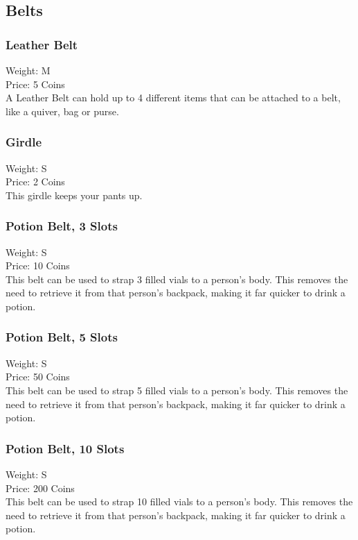 \subsection{Belts}\label{subsec:belts}

\subsubsection{Leather Belt}\label{item:leatherbelt}
Weight: M\\
Price: 5 Coins\\
A Leather Belt can hold up to 4 different items that can be attached to a belt, like a quiver, bag or purse.

\subsubsection{Girdle}\label{item:girdle}
Weight: S\\
Price: 2 Coins\\
This girdle keeps your pants up.

\subsubsection{Potion Belt, 3 Slots}\label{item:potionBeltThreeItems}
Weight: S\\
Price: 10 Coins\\
This belt can be used to strap 3 filled vials to a person's body.
This removes the need to retrieve it from that person's backpack, making it far quicker to drink a potion.

\subsubsection{Potion Belt, 5 Slots}\label{item:potionBeltFiveItems}
Weight: S\\
Price: 50 Coins\\
This belt can be used to strap 5 filled vials to a person's body.
This removes the need to retrieve it from that person's backpack, making it far quicker to drink a potion.

\subsubsection{Potion Belt, 10 Slots}\label{item:potionBelt10Items}
Weight: S\\
Price: 200 Coins\\
This belt can be used to strap 10 filled vials to a person's body.
This removes the need to retrieve it from that person's backpack, making it far quicker to drink a potion.



